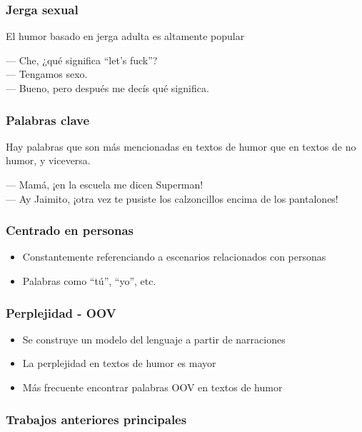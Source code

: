 \begin{frame}
    \frametitle{Jerga sexual}
    
    El humor basado en jerga adulta es altamente popular

    \begin{example}
        --- Che, ¿qué significa “let’s fuck”? \\
        --- Tengamos sexo. \\
        --- Bueno, pero después me decís qué significa.
    \end{example}
\end{frame}

\begin{frame}
    \frametitle{Palabras clave}
    
    Hay palabras que son más mencionadas en textos de humor que en textos de no humor, y viceversa.
    
    \begin{example}
        --- Mamá, ¡en la escuela me dicen Superman! \\
        --- Ay Jaimito, ¡otra vez te pusiste los calzoncillos encima de los pantalones!
    \end{example}
\end{frame}

\begin{frame}
    \frametitle{Centrado en personas}
    
    \begin{itemize}
        \item Constantemente referenciando a escenarios relacionados con personas
        \item Palabras como “tú”, “yo”, etc.
    \end{itemize}
\end{frame}

\begin{frame}
    \frametitle{Perplejidad - OOV}
    
    \begin{itemize}
        \item Se construye un modelo del lenguaje a partir de narraciones
        \item La perplejidad en textos de humor es mayor
        \item Más frecuente encontrar palabras OOV en textos de humor
    \end{itemize}
\end{frame}

\subsubsection{Trabajos anteriores principales}

